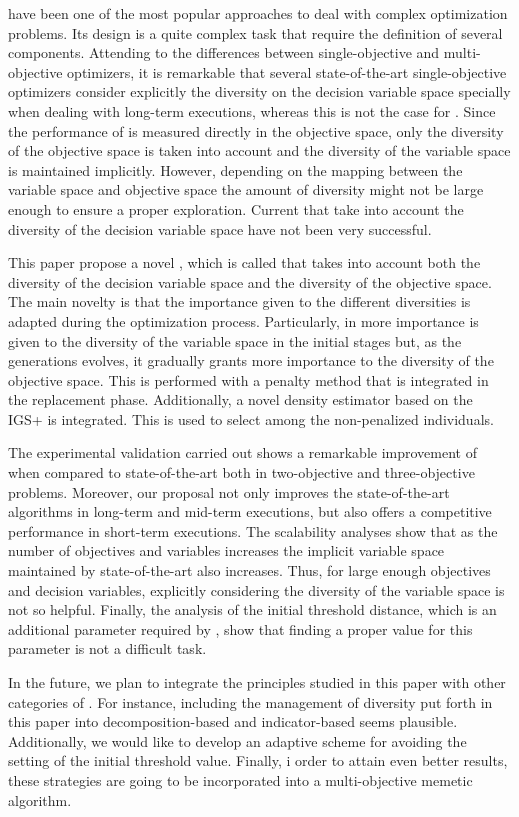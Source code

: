\EAS{} have been one of the most popular approaches to deal with complex optimization problems.
%
Its design is a quite complex task that require the definition of several components.
%
Attending to the differences between single-objective and multi-objective optimizers, it is remarkable
that several state-of-the-art single-objective optimizers consider explicitly the diversity on the decision variable space specially
when dealing with long-term executions, whereas this is not the case for \MOEAS{}.
%
Since the performance of \MOEAS{} is measured directly in the objective space, only the diversity of the objective space is taken
into account and the diversity of the variable space is maintained implicitly.
%
However, depending on the mapping between the variable space and objective space the amount of diversity might not be large enough
to ensure a proper exploration.
%
Current \MOEAS{} that take into account the diversity of the decision variable space have not been very successful. 

This paper propose a novel \MOEA{}, which is called \VSDMOEA{} that takes into account both the diversity of the decision variable space
and the diversity of the objective space.
%
The main novelty is that the importance given to the different diversities is adapted during the optimization process.
%
Particularly, in \VSDMOEA{} more importance is given to the diversity of the variable space in the initial stages
but, as the generations evolves, it gradually grants more importance to the diversity of the objective space.
%
This is performed with a penalty method that is integrated in the replacement phase.
%
Additionally, a novel density estimator based on the IGS+ is integrated.
%
This is used to select among the non-penalized individuals.

The experimental validation carried out shows a remarkable improvement of \VSDMOEA{} when compared to state-of-the-art \MOEAS{} both in
two-objective and three-objective problems.
%
Moreover, our proposal not only improves the state-of-the-art algorithms in long-term and mid-term executions,
but also offers a competitive performance in short-term executions.
%
The scalability analyses show that as the number of objectives and variables increases the implicit variable space maintained by state-of-the-art
\MOEAS{} also increases.
%
Thus, for large enough objectives and decision variables, explicitly considering the diversity of the variable space is not so helpful.
%
Finally, the analysis of the initial threshold distance, which is an additional parameter required by \VSDMOEA{}, show that finding a proper
value for this parameter is not a difficult task.

In the future, we plan to integrate the principles studied in this paper with other categories of \MOEAS{}.
%
For instance, including the management of diversity put forth in this paper into decomposition-based and indicator-based \MOEAS{} seems plausible.
%
Additionally, we would like to develop an adaptive scheme for avoiding the setting of the initial threshold value.
%
Finally, i order to attain even better results, these strategies are going to be incorporated into a multi-objective memetic algorithm.
%

